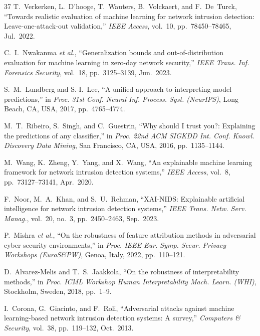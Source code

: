 \documentclass[conference]{IEEEtran}
\begin{document}
\begin{thebibliography}{37}
T.~Verkerken, L.~D'hooge, T.~Wauters, B.~Volckaert, and F.~De~Turck, ``Towards realistic evaluation of machine learning for network intrusion detection: Leave-one-attack-out validation,'' \textit{IEEE Access}, vol.~10, pp.~78450--78465, Jul.~2022.

C.~I.~Nwakanma \textit{et al.}, ``Generalization bounds and out-of-distribution evaluation for machine learning in zero-day network security,'' \textit{IEEE Trans. Inf. Forensics Security}, vol.~18, pp.~3125--3139, Jun.~2023.

S.~M.~Lundberg and S.-I.~Lee, ``A unified approach to interpreting model predictions,'' in \textit{Proc. 31st Conf. Neural Inf. Process. Syst. (NeurIPS)}, Long Beach, CA, USA, 2017, pp.~4765--4774.

M.~T.~Ribeiro, S.~Singh, and C.~Guestrin, ``Why should I trust you?: Explaining the predictions of any classifier,'' in \textit{Proc. 22nd ACM SIGKDD Int. Conf. Knowl. Discovery Data Mining}, San Francisco, CA, USA, 2016, pp.~1135--1144.

M.~Wang, K.~Zheng, Y.~Yang, and X.~Wang, ``An explainable machine learning framework for network intrusion detection systems,'' \textit{IEEE Access}, vol.~8, pp.~73127--73141, Apr.~2020.

F.~Noor, M.~A.~Khan, and S.~U.~Rehman, ``XAI-NIDS: Explainable artificial intelligence for network intrusion detection systems,'' \textit{IEEE Trans. Netw. Serv. Manag.}, vol.~20, no.~3, pp.~2450--2463, Sep.~2023.

P.~Mishra \textit{et al.}, ``On the robustness of feature attribution methods in adversarial cyber security environments,'' in \textit{Proc. IEEE Eur. Symp. Secur. Privacy Workshops (EuroS\&PW)}, Genoa, Italy, 2022, pp.~110--121.

D.~Alvarez-Melis and T.~S.~Jaakkola, ``On the robustness of interpretability methods,'' in \textit{Proc. ICML Workshop Human Interpretability Mach. Learn. (WHI)}, Stockholm, Sweden, 2018, pp.~1--9.

I.~Corona, G.~Giacinto, and F.~Roli, ``Adversarial attacks against machine learning-based network intrusion detection systems: A survey,'' \textit{Computers \& Security}, vol.~38, pp.~119--132, Oct.~2013.

\end{thebibliography}
\end{document}
